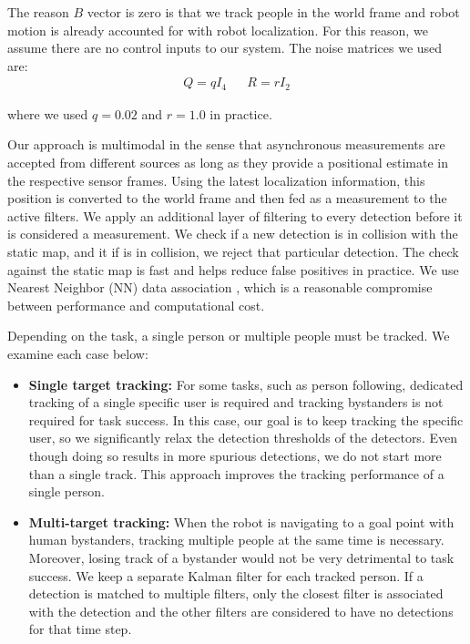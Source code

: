 The reason $B$ vector is zero is that we track people in the world frame and robot motion is already accounted for with robot localization. For this reason, we assume there are no control inputs to our system. The noise matrices we used are:
\begin{align}
Q=qI_4
&&
R=rI_2
\end{align}

where we used $q=0.02$ and $r=1.0$ in practice.

Our approach is multimodal in the sense that asynchronous measurements are accepted from different sources as long as they provide a positional estimate in the respective sensor frames. Using the latest localization information, this position is converted to the world frame and then fed as a measurement to the active filters. We apply an additional layer of filtering to every detection before it is considered a measurement. We check if a new detection is in collision with the static map, and it if is in collision, we reject that particular detection. The check against the static map is fast and helps reduce false positives in practice. We use Nearest Neighbor (NN) data association \cite{bar1995multitarget}, which is a reasonable compromise between performance and computational cost. 


Depending on the task, a single person or multiple people must be tracked. We examine each case below:

\begin{itemize}
\item \textbf{Single target tracking:} For some tasks, such as person following, dedicated tracking of a single specific user is required and tracking bystanders is not required for task success. In this case, our goal is to keep tracking the specific user, so we significantly relax the detection thresholds of the detectors. Even though doing so results in more spurious detections, we do not start more than a single track. This approach improves the tracking performance of a single person.
\item \textbf{Multi-target tracking:} When the robot is navigating to a goal point with human bystanders, tracking multiple people at the same time is necessary. Moreover, losing track of a bystander would not be very detrimental to task success. We keep a separate Kalman filter for each tracked person. If a detection is matched to multiple filters, only the closest filter is associated with the detection and the other filters are considered to have no detections for that time step.
\end{itemize}




